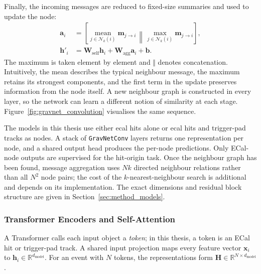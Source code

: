 Finally, the incoming messages are reduced to fixed-size summaries and used to
update the node:
\begin{align}
    \mathbf{a}_i
    &=
    \left[
        \underset{j\in\mathcal{N}_k(i)}{\operatorname{mean}}
        \mathbf{m}_{j\rightarrow i}
        \,\middle\Vert\,
        \underset{j\in\mathcal{N}_k(i)}{\operatorname{max}}
        \mathbf{m}_{j\rightarrow i}
    \right],
    \label{eq:gravnet_aggregation}\\
    \mathbf{h}'_i
    &=
    \mathbf{W}_{\mathrm{self}}\mathbf{h}_i
    +
    \mathbf{W}_{\mathrm{agg}}\mathbf{a}_i
    +\mathbf{b}.
    \label{eq:gravnet_update}
\end{align}
The maximum is taken element by element and \(\Vert\) denotes concatenation.
Intuitively, the mean describes the typical neighbour message, the maximum
retains its strongest components, and the first term in the update preserves
information from the node itself. A new neighbour graph is constructed in
every layer, so the network can learn a different notion of similarity at
each stage. Figure~\ref{fig:gravnet_convolution} visualises the same sequence.



The models in this thesis use either \gls{ecal} hits alone or \gls{ecal} hits
and trigger-pad tracks as nodes. A stack of \texttt{GravNetConv} layers
returns one representation per node, and a shared output head produces the
per-node predictions. Only ECal-node outputs are supervised for the
hit-origin task. Once the neighbour graph has been found, message aggregation
uses \(Nk\) directed neighbour relations rather than all \(N^2\) node pairs;
the cost of the \(k\)-nearest-neighbour search is additional and depends on
its implementation. The exact dimensions and residual block structure are
given in Section~\ref{sec:method_models}.

\subsubsection{Transformer Encoders and Self-Attention}
\label{sec:transformer_encoder_background}

A Transformer calls each input object a \emph{token}; in this thesis, a token
is an ECal hit or trigger-pad track. A shared input projection maps every
feature vector \(\mathbf{x}_i\) to
\(\mathbf{h}_i\in\mathbb{R}^{d_{\mathrm{model}}}\). For an event with \(N\)
tokens, the representations form
\(\mathbf{H}\in\mathbb{R}^{N\times d_{\mathrm{model}}}\).

